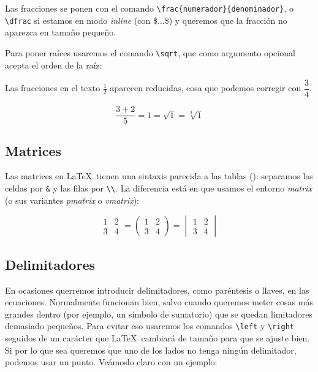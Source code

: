 Las fracciones se ponen con el comando \verb|\frac{numerador}{denominador}|, o \verb|\dfrac| si estamos en modo \textit{inline} (con \$...\$) y queremos que la fracción no aparezca en tamaño pequeño.

Para poner raíces usaremos el comando \verb|\sqrt|, que como argumento opcional acepta el orden de la raíz:

\begin{LTXexample}[pos=r]
Las fracciones en el texto $\frac{1}{2}$
aparecen reducidas, cosa que
podemos corregir con $\dfrac{3}{4}$.

\[ \frac{3 + 2}{5} = 1 = \sqrt{1} = \sqrt[3]{1}\]
\end{LTXexample}

\subsection{Matrices}

Las matrices en \LaTeX\ tienen una sintaxis parecida a las tablas (): separamos las celdas por \verb|&| y las filas por \verb|\\|. La diferencia está en que usamos el entorno \textit{matrix} (o sus variantes \textit{pmatrix} o \textit{vmatrix}):

\begin{LTXexample}[pos=r]
\[
\begin{matrix}
1 & 2 \\
3 & 4
\end{matrix} =
\begin{pmatrix}
1 & 2 \\ 3 & 4
\end{pmatrix} =
\begin{vmatrix}
1 & 2 \\ 3 & 4
\end{vmatrix}
\]
\end{LTXexample}

\subsection{Delimitadores}

En ocasiones querremos introducir delimitadores, como paréntesis o llaves, en las ecuaciones. Normalmente funcionan bien, salvo cuando queremos meter cosas más grandes dentro (por ejemplo, un símbolo de sumatorio) que se quedan limitadores demasiado pequeños. Para evitar eso usaremos los comandos \verb|\left| y \verb|\right| seguidos de un carácter que \LaTeX\ cambiará de tamaño para que se ajuste bien. Si por lo que sea queremos que uno de los lados no tenga ningún delimitador, podemos usar un punto. Veámoslo claro con un ejemplo:

